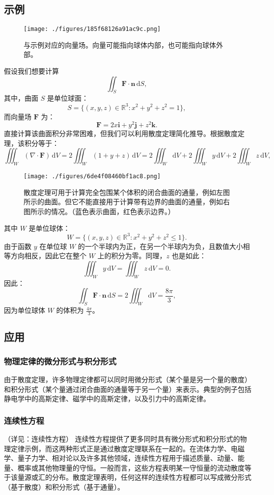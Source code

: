 \subsection{示例}
\begin{figure}[ht]
\centering
\texttt{[image: ./figures/185f68126a91ac9c.png]}
\caption{与示例对应的向量场。向量可能指向球体内部，也可能指向球体外部。} \label{fig_GSsd_5}
\end{figure}
假设我们想要计算
$$
\iint_S \mathbf{F} \cdot \mathbf{n} \, \mathrm{d}S,~
$$
其中，曲面 $S$ 是单位球面：
$$
S = \{ (x, y, z) \in \mathbb{R}^3 : x^2 + y^2 + z^2 = 1 \},~
$$
而向量场 $\mathbf{F}$ 为：
$$
\mathbf{F} = 2x\mathbf{i} + y^2\mathbf{j} + z^2\mathbf{k} .~
$$
直接计算该曲面积分非常困难，但我们可以利用散度定理简化推导。根据散度定理，该积分等于：
$$
\iiint_W (\nabla \cdot \mathbf{F}) \, \mathrm{d}V 
= 2 \iiint_W (1 + y + z) \, \mathrm{d}V
= 2 \iiint_W \mathrm{d}V
+ 2 \iiint_W y \, \mathrm{d}V
+ 2 \iiint_W z \, \mathrm{d}V ,~
$$
\begin{figure}[ht]
\centering
\texttt{[image: ./figures/6de4f08460bf1ac8.png]}
\caption{散度定理可用于计算完全包围某个体积的闭合曲面的通量，例如左图所示的曲面。但它不能直接用于计算带有边界的曲面的通量，例如右图所示的情况。（蓝色表示曲面，红色表示边界。）} \label{fig_GSsd_6}
\end{figure}
其中 $W$ 是单位球体：
$$
W = \{ (x, y, z) \in \mathbb{R}^3 : x^2 + y^2 + z^2 \leq 1 \}.~
$$
由于函数 $y$ 在单位球 $W$ 的一个半球内为正，在另一个半球内为负，且数值大小相等方向相反，因此它在整个 $W$ 上的积分为零。同理，$z$ 也是如此：
$$
\iiint_W y\,\mathrm{d}V = \iiint_W z\,\mathrm{d}V = 0.~
$$
因此：
$$
\iint_S \mathbf{F} \cdot \mathbf{n} \,\mathrm{d}S 
= 2 \iiint_W \mathrm{d}V 
= \frac{8\pi}{3},~
$$
因为单位球体 $W$ 的体积为 $\frac{4\pi}{3}$。
\subsection{应用}
\subsubsection{物理定律的微分形式与积分形式}
由于散度定理，许多物理定律都可以同时用微分形式（某个量是另一个量的散度）和积分形式（某个量通过闭合曲面的通量等于另一个量）来表示。典型的例子包括静电学中的高斯定律、磁学中的高斯定律，以及引力中的高斯定律。
\subsubsection{连续性方程}
（详见：连续性方程）
连续性方程提供了更多同时具有微分形式和积分形式的物理定律示例，而这两种形式正是通过散度定理联系在一起的。在流体力学、电磁学、量子力学、相对论以及许多其他领域，连续性方程用于描述质量、动量、能量、概率或其他物理量的守恒。一般而言，这些方程表明某一守恒量的流动散度等于该量源或汇的分布。散度定理表明，任何这样的连续性方程都可以写成微分形式（基于散度）和积分形式（基于通量）。

